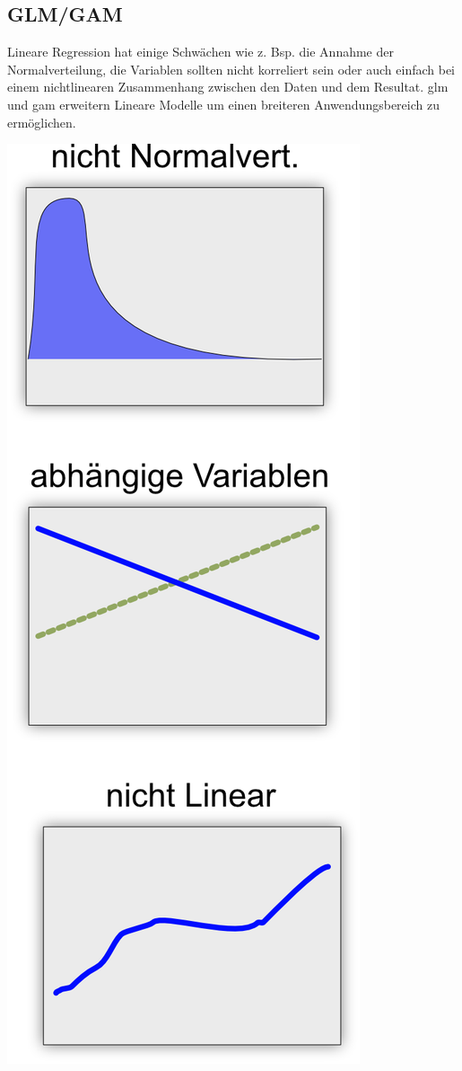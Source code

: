 \documentclass[
  12pt, %
  a4paper, %
  oneside, %
  openany, 
  numbers=noenddot, %
  BCOR=5mm, %
  parskip=half*, %
  thesis, %
]{bfhbook}
\begin{document}
\subsection{GLM/GAM}
\label{gam}
Lineare Regression hat einige Schwächen wie z. Bsp. die Annahme der Normalverteilung, die Variablen sollten nicht korreliert sein oder auch einfach bei einem nichtlinearen Zusammenhang zwischen den Daten und dem Resultat. \acrfull{glm} und \acrfull{gam} erweitern Lineare Modelle um einen breiteren Anwendungsbereich zu ermöglichen.
\begin{center}
\begin{minipage}[t]{0.3\linewidth}
\vspace{0pt}
\includegraphics[width=0.6\linewidth]{Bilder/Regressions-Auschluss-Bedingungen.png}

\end{minipage}
\end{center}
\end{document}
